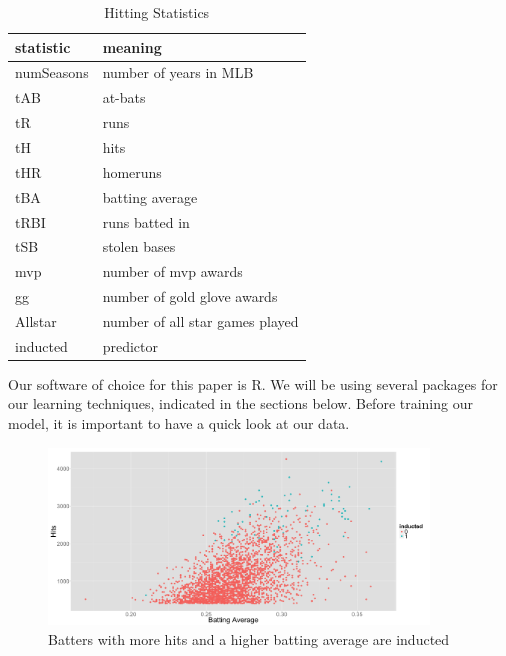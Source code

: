 \documentclass[preprint,12pt]{elsarticle}
\begin{document}
\begin{table}[h]
\centering
\begin{tabular}{|l | l|}
\hline
statistic & meaning \\
\hline
	numSeasons & number of years in MLB \\
	tAB & at-bats \\
	tR & runs \\
	tH & hits \\
	tHR & homeruns \\
	tBA & batting average \\
	tRBI & runs batted in \\
	tSB & stolen bases \\
	mvp & number of mvp awards \\
	gg & number of gold glove awards \\
	Allstar & number of all star games played \\
	inducted & predictor \\
\hline
\end{tabular}
\caption{Hitting Statistics}
\end{table}


Our software of choice for this paper is R. We will be using several packages for our learning techniques, indicated in the sections below. Before training our model, it is important to have a quick look at our data.

\begin{figure}[h]
	\centering
	\includegraphics[width=0.9\textwidth]{BAandHits}
	\caption{Batters with more hits and a higher batting average are inducted}
\end{figure}
\end{document}
